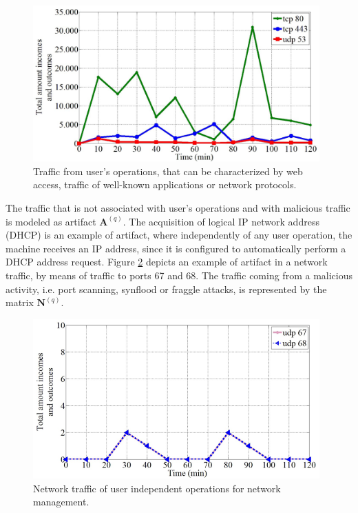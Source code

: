 \begin{figure}[h!]
     \centering 
     \includegraphics[width=11cm]{figs/ch2/fig03.png}
     \caption{Traffic from user's operations, that can be characterized by web access, traffic of well-known applications or network protocols.}
     \label{fig:2.03}
\end{figure}

The traffic that is not associated with user's operations and with malicious traffic is modeled as artifact $\pmb{A}^{(q)}$. The acquisition of logical IP network address (DHCP) is an example of artifact, where independently of any user operation, the machine receives an IP address, since it is configured to automatically perform a DHCP address request. Figure \ref{fig:2.04} depicts an example of artifact in a network traffic, by means of traffic to ports 67 and 68. The traffic coming from a malicious activity, i.e. port scanning, synflood or fraggle attacks, is represented by the matrix $\pmb{N}^{(q)}$.

\begin{figure}[h!]
     \centering 
     \includegraphics[width=11cm]{figs/ch2/fig04.png}
     \caption{Network traffic of user independent operations for network management.}
     \label{fig:2.04}
\end{figure}

